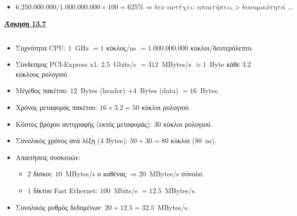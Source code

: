 \documentclass{article}
\begin{document}
\begin{itemize}
    \item {} ${6.250.000.000} / {1.000.000.000} \times 100 = 625\% \Rightarrow \text{δεν αντέχει: απαιτήσεις} > \text{δυναμικότητά } ...$
\end{itemize}




\newpage

\text{   }
\begin{center}
    \vspace{-1.5cm}
    {\underline{\Large \textbf{Άσκηση 13.7}}}
\end{center}
\vspace{0.345cm}

\subsection*{}

\begin{itemize}
    \item Συχνότητα \textlatin{CPU}: $1$~\textlatin{GHz} $= 1$ κύκλος/\textlatin{ns} $= 1.000.000.000$ κύκλοι/δευτερόλεπτο.
    \item Σύνδεσμος \textlatin{PCI-Express x1}: $2.5$~\textlatin{Gbits/s} $= 312$~\textlatin{MBytes/s} $\approx 1$~\textlatin{Byte} κάθε $3.2$ κύκλους ρολογιού.
    \item Μέγεθος πακέτου: $12$~\textlatin{Bytes} \textlatin{(header)} $+ 4$~\textlatin{Bytes} \textlatin{(data)} $= 16$~\textlatin{Bytes}.
    \item Χρόνος μεταφοράς πακέτου: $16 \times 3.2 = 50$ κύκλοι ρολογιού.
    \item Κόστος βρόχου αντιγραφής (εκτός μεταφοράς): $30$ κύκλοι ρολογιού.
    \item Συνολικός χρόνος ανά λέξη (4 \textlatin{Bytes}): $50 + 30 = 80$ κύκλοι ($80$~\textlatin{ns}).
    \item Απαιτήσεις συσκευών:
    \begin{itemize}
        \item $2$ δίσκοι: $10$~\textlatin{MBytes/s} ο καθένας $\Rightarrow 20$~\textlatin{MBytes/s} σύνολο.
        \item $1$ δίκτυο \textlatin{Fast Ethernet}: $100$~\textlatin{Mbits/s} $= 12.5$~\textlatin{MBytes/s}.
    \end{itemize}
    \item Συνολικός ρυθμός δεδομένων: $20 + 12.5 = 32.5$~\textlatin{MBytes/s}.
\end{itemize}
\end{document}
